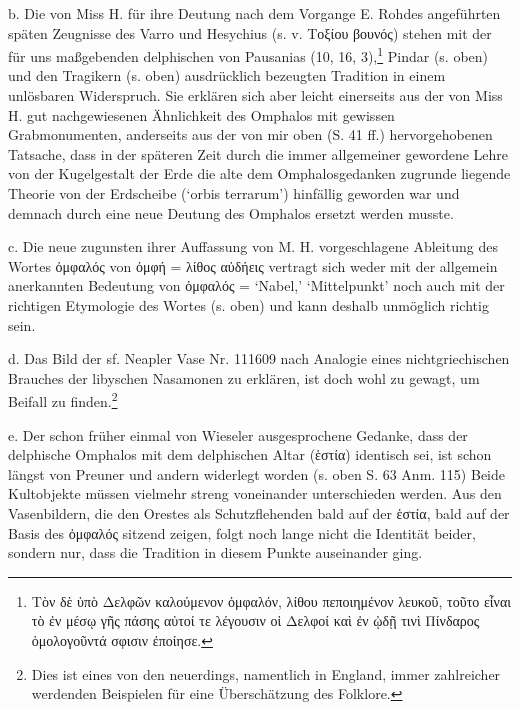 \documentclass[a4paper, 11pt, oneside]{article}
\begin{document}
b. Die von Miss H. für ihre Deutung nach dem Vorgange E. Rohdes angeführten späten Zeugnisse des Varro und Hesychius (s. v. Τοξίου βουνός) stehen mit der für uns maßgebenden delphischen von Pausanias (10, 16, 3),\footnote{Τὸν δὲ ὑπὸ Δελφῶν καλούμενον ὀμφαλόν, λίθου πεποιημένον λευκοῦ, τοῦτο εἶναι τὸ ἐν μέσῳ γῆς πάσης αὐτοί τε λέγουσιν οἱ Δελφοί καὶ ἐν ᾠδῇ τινὶ Πίνδαρος ὁμολογοῦντά σφισιν ἐποίησε.} Pindar (s. oben) und den Tragikern (s. oben) ausdrücklich bezeugten Tradition in einem unlösbaren Widerspruch. Sie erklären sich aber leicht einerseits aus der von Miss H. gut nachgewiesenen Ähnlichkeit des Omphalos mit gewissen Grabmonumenten, anderseits aus der von mir oben (S. 41 ff.) hervorgehobenen Tatsache, dass in der späteren Zeit durch die immer allgemeiner gewordene Lehre von der Kugelgestalt der Erde die alte dem Omphalosgedanken zugrunde liegende Theorie von der Erdscheibe (`orbis terrarum') hinfällig geworden war und demnach durch eine neue Deutung des Omphalos ersetzt werden musste.

c. Die neue zugunsten ihrer Auffassung von M. H. vorgeschlagene Ableitung des Wortes ὀμφαλός von ὀμφή = λίθος αὐδήεις vertragt sich weder mit der allgemein anerkannten Bedeutung von ὀμφαλός = `Nabel,' `Mittelpunkt' noch auch mit der richtigen Etymologie des Wortes (s. oben) und kann deshalb unmöglich richtig sein.

d. Das Bild der sf. Neapler Vase Nr. 111609 nach Analogie eines nichtgriechischen Brauches der libyschen Nasamonen zu erklären, ist doch wohl zu gewagt, um Beifall zu finden.\footnote{Dies ist eines von den neuerdings, namentlich in England, immer zahlreicher werdenden Beispielen für eine Überschätzung des Folklore.}

e. Der schon früher einmal von Wieseler ausgesprochene Gedanke, dass der delphische Omphalos mit dem delphischen Altar (ἑστία) identisch sei, ist schon längst von Preuner und andern widerlegt worden (s. oben S. 63 Anm. 115) Beide Kultobjekte müssen vielmehr streng voneinander unterschieden werden. Aus den Vasenbildern, die den Orestes als Schutzflehenden bald auf der ἑστία, bald auf der Basis des ὀμφαλός sitzend zeigen, folgt noch lange nicht die Identität beider, sondern nur, dass die Tradition in diesem Punkte auseinander ging.
\end{document}
